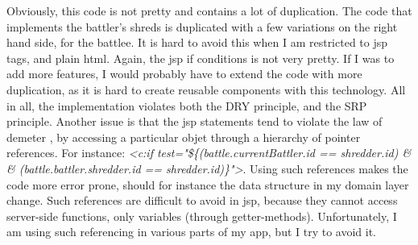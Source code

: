 		  Obviously, this code is not pretty and contains a lot of duplication. The code that implements the battler's shreds is duplicated with a few variations on the right hand side, for the battlee. It is hard to avoid this when I am restricted to jsp tags, and plain html.  Again, the jsp if conditions is not very pretty. If I was to add more features, I would probably have to extend the code with more duplication, as it is hard to create reusable components with this technology. All in all, the implementation violates both the DRY principle, and the SRP principle. Another issue is that the jsp statements tend to violate the law of demeter \cite{pragmatic}, by accessing a particular objet through a hierarchy of pointer references. For instance: \emph{<c:if test="\$\{(battle.currentBattler.id == shredder.id) \& \& (battle.battler.shredder.id == shredder.id)\}">}. Using such references makes the code more error prone, should for instance the data structure in my domain layer change. Such references are difficult to avoid in jsp, because they cannot access server-side functions, only variables (through getter-methods). Unfortunately, I am using such referencing in various parts of my app, but I try to avoid it. 
		  
